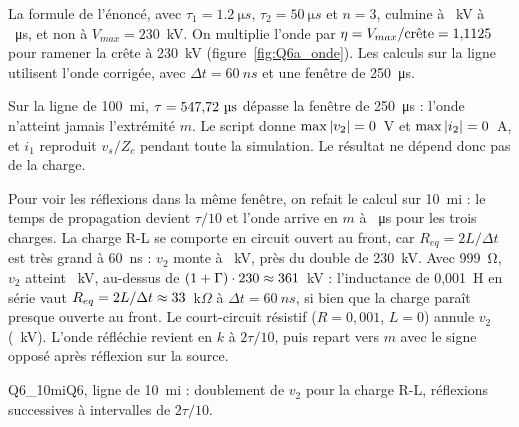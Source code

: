 La formule de l'énoncé, avec $\tau_1 = \SI{1.2}{\micro s}$, $\tau_2 = \SI{50}{\micro s}$ et
$n = 3$, culmine à \chocCrete~kV à \chocTc~\unit{\micro s}, et non à $V_{max} = 230$~kV. On
multiplie l'onde par $\eta = V_{max}/\text{crête} = 1{,}1125$ pour ramener la crête à 230~kV
(figure~\ref{fig:Q6a_onde}). Les calculs sur la ligne utilisent l'onde corrigée, avec
$\Delta t = \SI{60}{ns}$ et une fenêtre de \SI{250}{\micro s}.


Sur la ligne de 100~mi, $\tau = \tauL~\unit{\micro s}$ dépasse la fenêtre de
\SI{250}{\micro s} : l'onde n'atteint jamais l'extrémité $m$. Le script donne
$\max|v_2| = 0$~V et $\max|i_2| = 0$~A, et $i_1$ reproduit $v_s/Z_c$ pendant toute la
simulation. Le résultat ne dépend donc pas de la charge.

Pour voir les réflexions dans la même fenêtre, on refait le calcul sur 10~mi : le temps de
propagation devient $\tau/10$ et l'onde arrive en $m$ à \gArrRL~\unit{\micro s} pour les trois
charges. La charge R-L se comporte en circuit ouvert au front, car $R_{eq} = 2L/\Delta t$ est
très grand à \SI{60}{ns} : $v_2$ monte à \gVRL~kV, près du double de 230~kV. Avec
999~\unit{\ohm}, $v_2$ atteint \gVOuv~kV, au-dessus de $(1+\Gamma)\cdot 230 \approx 361$~kV :
l'inductance de 0,001~H en série vaut $R_{eq} = 2L/\Delta t \approx 33$~k$\Omega$ à
$\Delta t = \SI{60}{ns}$, si bien que la charge paraît presque ouverte au front. Le court-circuit
résistif ($R = 0{,}001$, $L = 0$) annule $v_2$ (\gVCC~kV). L'onde réfléchie revient en $k$ à
$2\tau/10$, puis repart vers $m$ avec le signe opposé après réflexion sur la source.

{Q6_10mi}{Q6, ligne de 10~mi : doublement de $v_2$ pour la charge R-L, réflexions successives à
intervalles de $2\tau/10$.}
